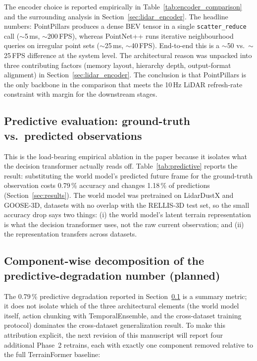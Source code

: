 \documentclass[sensors,article,submit,pdftex,moreauthors]{Definitions/mdpi}
\providecommand{\DIFadd}[1]{{\protect\color{red}#1}} %
\begin{document}
\DIFadd{The encoder choice is reported empirically in Table~\ref{tab:encoder_comparison} and the surrounding analysis in Section~\ref{sec:lidar_encoder}. The headline numbers: PointPillars produces a dense BEV tensor in a single }\texttt{\DIFadd{scatter\_reduce}} \DIFadd{call ($\sim$5\,ms, $\sim$200\,FPS), whereas PointNet++ runs iterative neighbourhood queries on irregular point sets ($\sim$25\,ms, $\sim$40\,FPS). End-to-end this is a $\sim$50 vs.\ $\sim$25\,FPS difference at the system level. The architectural reason was unpacked into three contributing factors (memory layout, hierarchy depth, output-format alignment) in Section~\ref{sec:lidar_encoder}. The conclusion is that PointPillars is the only backbone in the comparison that meets the 10\,Hz LiDAR refresh-rate constraint with margin for the downstream stages.
}

\subsection{\DIFadd{Predictive evaluation: ground-truth vs.\ predicted observations}}
\label{sec:ablation_predictive}

\DIFadd{This is the load-bearing empirical ablation in the paper because it isolates what the decision transformer actually reads off. Table~\ref{tab:predictive} reports the result: substituting the world model's predicted future frame for the ground-truth observation costs 0.79\,\% accuracy and changes 1.18\,\% of predictions (Section~\ref{sec:results}). The world model was pretrained on LidarDustX and GOOSE-3D, datasets with no overlap with the RELLIS-3D test set, so the small accuracy drop says two things: (i) the world model's latent terrain representation is what the decision transformer uses, not the raw current observation; and (ii) the representation transfers across datasets.
}

\subsection{\DIFadd{Component-wise decomposition of the predictive-degradation number (planned)}}
\label{sec:ablation_decomposition}

\DIFadd{The 0.79\,\% predictive degradation reported in Section~\ref{sec:ablation_predictive} is a summary metric; it does not isolate which of the three architectural elements (the world model itself, action chunking with TemporalEnsemble, and the cross-dataset training protocol) dominates the cross-dataset generalization result. To make this attribution explicit, the next revision of this manuscript will report four additional Phase~2 retrains, each with exactly one component removed relative to the full TerrainFormer baseline:
}
\end{document}
